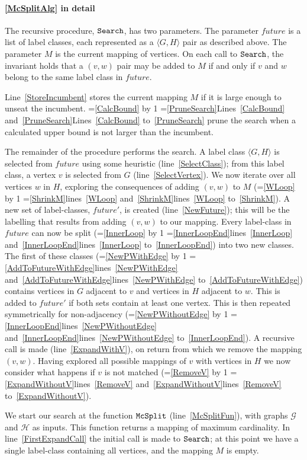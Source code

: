 \documentclass[letterpaper]{article}
\newcommand{\AlgVar}[1]{\mathit{#1}}
\newcommand{\graphG}{\mathcal{G}}
\newcommand{\graphH}{\mathcal{H}}
\newcommand{\setG}{G}
\newcommand{\setH}{H}
\newcommand{\lineref}[1]{line~\ref{#1}}
\newcommand{\linerangeref}[2]{\count255=\ref{#1}\advance\count255 by 1 \ifnum\count255=\ref{#2}lines~\ref{#1} and~\ref{#2}\else lines~\ref{#1} to~\ref{#2}\fi}
\newcommand{\Lineref}[1]{Line~\ref{#1}}
\newcommand{\Linerangeref}[2]{\count255=\ref{#1}\advance\count255 by 1 \ifnum\count255=\ref{#2}Lines~\ref{#1} and~\ref{#2}\else Lines~\ref{#1} to~\ref{#2}\fi}
\begin{document}
\paragraph{\cref{McSplitAlg} in detail} The recursive procedure,
$\FuncSty{Search}$, has two parameters.  The parameter $\AlgVar{future}$ is a
list of label classes, each represented as a $\langle \setG, \setH \rangle$ pair as
described above.  The parameter $M$ is the current mapping of vertices.  On
each call to $\FuncSty{Search}$, the invariant holds that a $(v,w)$ pair may be
added to $M$ if and only if $v$ and $w$ belong to the same label class in
$\AlgVar{future}$.

\Lineref{StoreIncumbent} stores the current mapping $M$ if it is large enough
to unseat the incumbent.  \Linerangeref{CalcBound}{PruneSearch} prune the
search when a calculated upper bound is not larger than the incumbent.

The remainder of the procedure performs the search.  A label class
$\langle \setG, \setH \rangle$ is selected from $\AlgVar{future}$
using some heuristic
(\lineref{SelectClass}); from this label class, a vertex $v$ is selected
from $\setG$ (\lineref{SelectVertex}). We now iterate over all
vertices $w$ in $\setH$, exploring the consequences of adding $(v,w)$ to $M$
(\linerangeref{WLoop}{ShrinkM}).  A new set of label-classes,
$\AlgVar{future'}$,
is created (\lineref{NewFuture}); this will be the labelling that results
from adding $(v,w)$ to our mapping.  Every label-class in $\AlgVar{future}$ can
now be split (\linerangeref{InnerLoop}{InnerLoopEnd}) into two new classes. The
first of these classes (\linerangeref{NewPWithEdge}{AddToFutureWithEdge})
contains vertices in $\setG$ adjacent to $v$ and vertices in $\setH$ adjacent to $w$.
This is added to $\AlgVar{future'}$ if both sets contain at least one vertex.
This is then repeated symmetrically for non-adjacency
(\linerangeref{NewPWithoutEdge}{InnerLoopEnd}). A recursive call is made
(\lineref{ExpandWithV}), on return from which we remove the mapping $(v,w)$.
Having explored all possible mappings of $v$ with vertices in $\setH$ we now
consider what happens if $v$ is not matched
(\linerangeref{RemoveV}{ExpandWithoutV}).

We start our search at the function $\FuncSty{McSplit}$ (\lineref{McSplitFun}),
with graphs $\graphG$ and $\graphH$ as inputs.  This function returns a mapping of
maximum cardinality.  In \lineref{FirstExpandCall} the initial call is made to
$\FuncSty{Search}$; at this point we have a single label-class containing all
vertices, and the mapping $M$ is empty.
\end{document}
